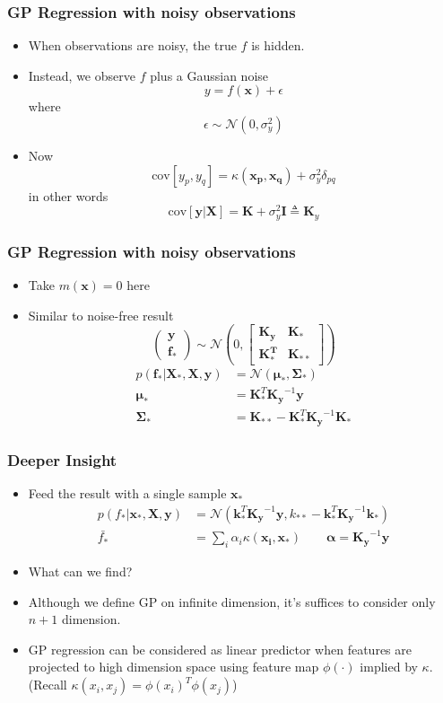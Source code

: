 \documentclass{beamer}
\begin{document}
\begin{frame}
	\frametitle{GP Regression with noisy observations}
	\begin{itemize}
		\item When observations are noisy, the true $f$ is hidden.
		\item Instead, we observe $f$ plus a Gaussian noise 
			\[
				y=f(\bm{x})+\epsilon
			\]
			where\[
			\epsilon \sim \mathcal{N}(0, \sigma_y^2)
			\]
		\item Now \[
		\text{cov}[y_p, y_q] = \kappa(\bm{x_p, x_q})+\sigma_y^2\delta_{pq}
		\] in other words
		\[
		\text{cov}[\bm{y|X}] = \bm{K}+\sigma_y^2 \bm{I} \triangleq \bm{K}_y
		\]
	\end{itemize}
\end{frame}
\begin{frame}
	\frametitle{GP Regression with noisy observations}
	\begin{itemize}
		\item Take $m(\bm{x})=0$ here
		\item Similar to noise-free result
		\[\left( {\begin{array}{*{20}{c}}
			\bm{y}\\
			{\bm{f_*}}
			\end{array}} \right)\sim \mathcal{N}\left( 0, {\left[ {\begin{array}{*{20}{c}}
				\bm{K_y}&{\bm{K_*}}\\
				\bm{K_*^T}&{\bm{K_{**}}}
				\end{array}} \right]} \right)\]
			\begin{align*}
			p(\bm{f_*|X_*,X,y}) & = \mathcal{N}(\bm{\mu_*, \Sigma_*}) \\
			\bm{\mu_*} & = \bm{K}_*^T \bm{K_y}^{-1}\bm{y} \\
			\bm{\Sigma_*} & = \bm{K}_{**}-\bm{K}_*^T\bm{K_y}^{-1}\bm{K}_*
			\end{align*}
	\end{itemize}
\end{frame}
\begin{frame}
	\frametitle{Deeper Insight}
	\begin{itemize}
		\item {Feed the result with a single sample $\bm{x_*}$}
			\begin{align*}
			p(f_*|\bm{x_*,X,y}) &= \mathcal{N}(\bm{k}_*^T \bm{K_y}^{-1}\bm{y}, k_{**}-\bm{k}_*^T\bm{K_y}^{-1}\bm{k}_*) \\
			\bar{f_*} & = \sum_i \alpha_i \kappa(\bm{x_i, x_*}) \qquad \bm{\alpha}=\bm{K_y}^{-1}\bm{y}
			\end{align*}
		\item {What can we find?}
		\pause
		\item Although we define GP on infinite dimension, it's suffices to consider only $n+1$ dimension. 
		\item GP regression can be considered as linear predictor when features are projected to high dimension space using feature map $\phi(\cdot)$ implied by $\kappa$.	(Recall $\kappa(x_i, x_j) = \phi(x_i)^T\phi(x_j)$)
	\end{itemize}
\end{frame}
\end{document}

